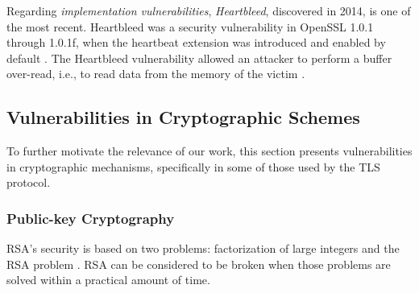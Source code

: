 \documentclass{sig-alternate-05-2015}
\begin{document}
Regarding \emph{implementation vulnerabilities}, \textit{Heartbleed}, discovered in 2014, is one of the most recent. %
Heartbleed was a security vulnerability in OpenSSL 1.0.1 through 1.0.1f, when the heartbeat extension was introduced and enabled by default \cite{heartbeat-extension}. The Heartbleed vulnerability allowed an attacker to perform a buffer over-read, i.e., to read data from the memory of the victim \cite{Carvalho2014-HB}. %
%
%


\subsection{Vulnerabilities in Cryptographic Schemes}

To further motivate the relevance of our work, 
this section presents  vulnerabilities in cryptographic mechanisms, specifically in some of those used by the TLS protocol. %

\subsubsection{Public-key Cryptography}

RSA's security is based on two problems: factorization of large integers and the RSA problem \cite{Menezes1996}.
RSA can be considered to be broken when those problems are solved within a practical amount of time.
\end{document}
